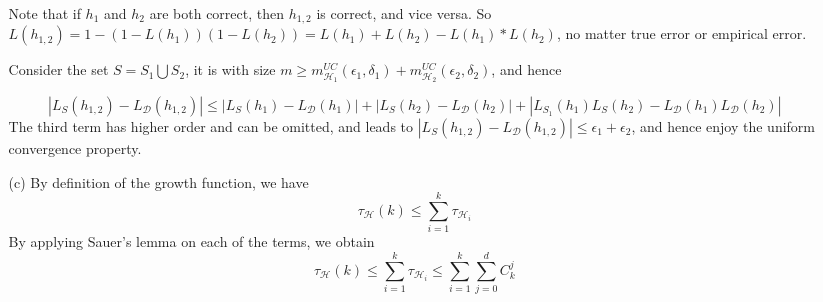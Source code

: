 \documentclass{article}
\begin{document}
\begin{itemize}
\begin{itemize}
	Note that if $h_1$ and $h_2$ are both correct, then $h_{1,2}$ is correct, and vice versa. So $L(h_{1,2})=1-(1-L(h_1))(1-L(h_2))=L(h_1)+L(h_2)-L(h_1)*L(h_2)$, no matter true error or empirical error.
	
	Consider the set $S=S_1\bigcup S_2$, it is with size $m\geq m_{\mathcal{H}_1}^{UC}(\epsilon_1,\delta_1) + m_{\mathcal{H}_2}^{UC}(\epsilon_2,\delta_2)$, and hence
	
	$$|L_S(h_{1,2})-L_{\mathcal{D}}(h_{1,2})| \leq |L_S(h_1)-L_{\mathcal{D}}(h_1)|+|L_S(h_2)-L_{\mathcal{D}}(h_2)| + |L_{S_1}(h_1)L_S(h_2)-L_{\mathcal{D}}(h_1)L_{\mathcal{D}}(h_2)|
	$$
	The third term has higher order and can be omitted, and leads to $|L_S(h_{1,2})-L_{\mathcal{D}}(h_{1,2})| \leq  \epsilon_1 + \epsilon_2$, and hence enjoy the uniform convergence property.
	\item[(c)] By definition of the growth function, we have
		\begin{equation*}
		\tau_{\mathcal{H}}(k) \leq \sum_{i=1}^k \tau_{\mathcal{H}_i}
		\end{equation*}
By applying Sauer's lemma on each of the terms, we obtain
	\begin{equation*}
	\tau_{\mathcal{H}}(k) \leq \sum_{i=1}^k \tau_{\mathcal{H}_i} \leq  \sum_{i=1}^k \sum_{j=0}^d C_k^j
	\end{equation*}
	\end{itemize}
	
\end{itemize}
\end{document}
